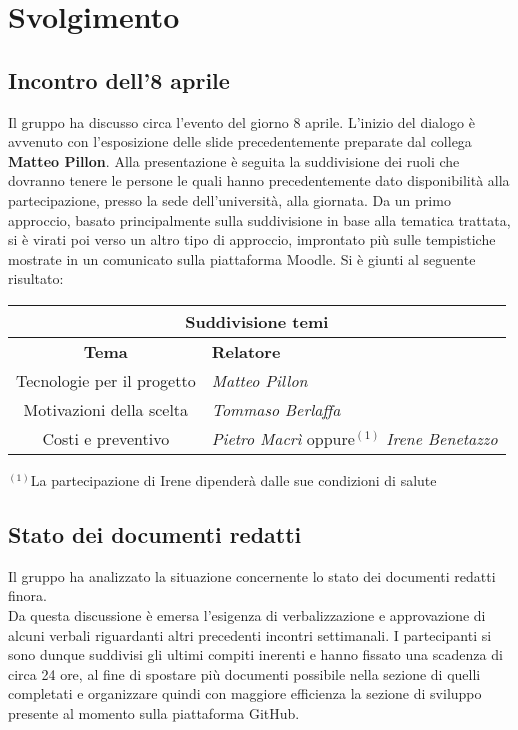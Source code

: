     \section{Svolgimento}

    \subsection {Incontro dell'8 aprile}
    Il gruppo ha discusso circa l'evento del giorno 8 aprile. L'inizio del dialogo è avvenuto con l'esposizione delle slide precedentemente preparate dal collega \textbf{Matteo Pillon}.
    \newline
    Alla presentazione è seguita la suddivisione dei ruoli che dovranno tenere le persone le quali hanno precedentemente dato disponibilità alla partecipazione, presso la sede dell'università, alla giornata.
    Da un primo approccio, basato principalmente sulla suddivisione in base alla tematica trattata, si è virati poi verso un altro tipo di approccio, improntato più sulle tempistiche mostrate in un comunicato sulla piattaforma Moodle.
    \newline
    Si è giunti al seguente risultato:
    \renewcommand{\arraystretch}{1.8} %
    \begin{center}
    \begin{tabular}{ |c|l| }
        \hline \multicolumn{2}{|c|}{\textbf{Suddivisione temi}} \\
        \hline
        \textbf{Tema} & \textbf{Relatore} 
        \\
        \hline
        Tecnologie per il progetto & \textit{Matteo Pillon}
        \\
        \hline
        Motivazioni della scelta & \textit{Tommaso Berlaffa}
        \\
        \hline
        Costi e preventivo & \textit{Pietro Macrì} oppure$^{(1)}$ \textit{Irene Benetazzo}\\
        \hline
    \end{tabular}
    \newline
    \end{center}
     $^{(1)}$La partecipazione di Irene dipenderà dalle sue condizioni di salute

    \subsection {Stato dei documenti redatti}
    Il gruppo ha analizzato la situazione concernente lo stato dei documenti redatti finora. 
    \\ Da questa discussione è emersa l'esigenza
    di verbalizzazione e approvazione di alcuni verbali riguardanti altri precedenti incontri settimanali.
    \newline
    I partecipanti si sono dunque suddivisi gli ultimi compiti inerenti e hanno fissato una scadenza di circa 24 ore, al
    fine di spostare più documenti possibile nella sezione di quelli completati e organizzare quindi con maggiore efficienza
    la sezione di sviluppo presente al momento sulla piattaforma GitHub.

    \vspace{1em} 

    